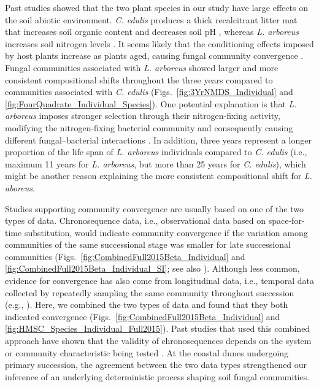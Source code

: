 Past studies showed that the two plant species in our study have large effects on the soil abiotic environment.
\textit{C. edulis} produces a thick recalcitrant litter mat that increases soil organic content and decreases soil pH \citep{Novoa2013, Novoa2014}, whereas \textit{L. arboreus} increases soil nitrogen levels \citep{Maron1996, Maron2001}. 
It seems likely that the conditioning effects imposed by host plants increase as plants aged, causing fungal community convergence \citep{Dinnage2019}. 
Fungal communities associated with \textit{L. arboreus} showed larger and more consistent compositional shifts throughout the three years compared to communities associated with \textit{C. edulis} (Figs.~\ref{fig:3YrNMDS_Individual} and \ref{fig:FourQuadrate_Individual_Species}). 
One potential explanation is that \textit{L. arboreus} imposes stronger selection through their nitrogen-fixing activity, modifying the nitrogen-fixing bacterial community and consequently causing different fungal--bacterial interactions \citep{Johansson2004}.
In addition, three years represent a longer proportion of the life span of \textit{L. arboreus} individuals compared to \textit{C. edulis} (i.e., maximum 11 years for \textit{L. arboreus}, but more than 25 years for \textit{C. edulis}), which might be another reason explaining the more consistent compositional shift for \textit{L. aboreus}. 
\par


Studies supporting community convergence are usually based on one of the two types of data. Chronosequence data, i.e., observational data based on space-for-time substitution, would indicate community convergence if the variation among communities of the same successional stage was smaller for late successional communities (Figs.~\ref{fig:CombinedFull2015Beta_Individual} and \ref{fig:CombinedFull2015Beta_Individual_SI}; see also \citealp{BrownJumpponen2014, Castle2016, RoyBolduc2016}).
Although less common, evidence for convergence has also come from longitudinal data, i.e., temporal data collected by repeatedly sampling the same community throughout succession (e.g., \citealp{Fukami2005, Li2016, Gao2019}).
Here, we combined the two types of data and found that they both indicated convergence (Figs.~\ref{fig:CombinedFull2015Beta_Individual} and \ref{fig:HMSC_Species_Individual_Full2015}). 
Past studies that used this combined approach have shown that the validity of chronosequences depends on the system or community characteristic being tested \citep{Foster2000, Clark2019}.
At the coastal dunes undergoing primary succession, the agreement between the two data types strengthened our inference of an underlying deterministic process shaping soil fungal communities. 
\par


